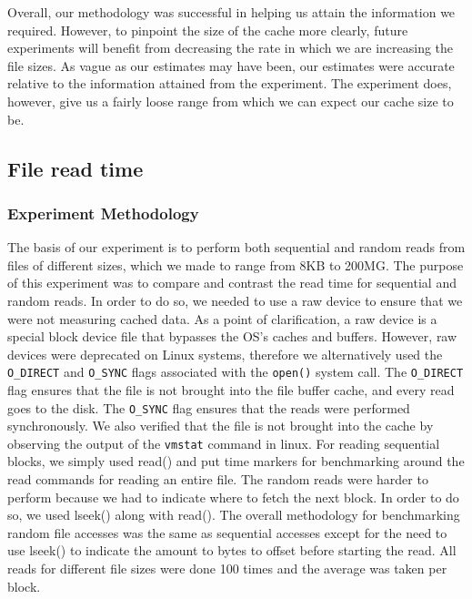 \documentclass{article} %
\begin{document}
Overall, our methodology was successful in helping us attain the information we required. However, to pinpoint the size of the cache more clearly, future experiments will benefit from decreasing the rate in which we are increasing the file sizes. As vague as our estimates may have been, our estimates were accurate relative to the information attained from the experiment. The experiment does, however, give us a fairly loose range from which we can expect our cache size to be.

\subsection{File read time}

\subsubsection{Experiment Methodology}
The basis of our experiment is to perform both sequential and random reads from files of different sizes, which we made to range from 8KB to 200MG\@. The purpose of this experiment was to compare and contrast the read time for sequential and random reads. In order to do so, we needed to use a raw device to ensure that we were not measuring cached data. As a point of clarification, a raw device is a special block device file that bypasses the OS's caches and buffers. However, raw devices were deprecated on Linux systems, therefore we alternatively used the \texttt{O\_DIRECT} and \texttt{O\_SYNC} flags associated with the \texttt{open()} system call. The \texttt{O\_DIRECT} flag ensures that the file is not brought into the file buffer cache, and every read goes to the disk. The \texttt{O\_SYNC} flag ensures that the reads were performed synchronously.
We also verified that the file is not brought into the cache by observing the output of the \texttt{vmstat} command in linux. For reading sequential blocks, we simply used read() and put time markers for benchmarking around the read commands for reading an entire file. The random reads were harder to perform because we had to indicate where to fetch the next block. In order to do so, we used lseek() along with read(). The overall methodology for benchmarking random file accesses was the same as sequential accesses except for the need to use lseek() to indicate the amount to bytes to offset before starting the read. All reads for different file sizes were done 100 times and the average was taken per block.
\end{document}
